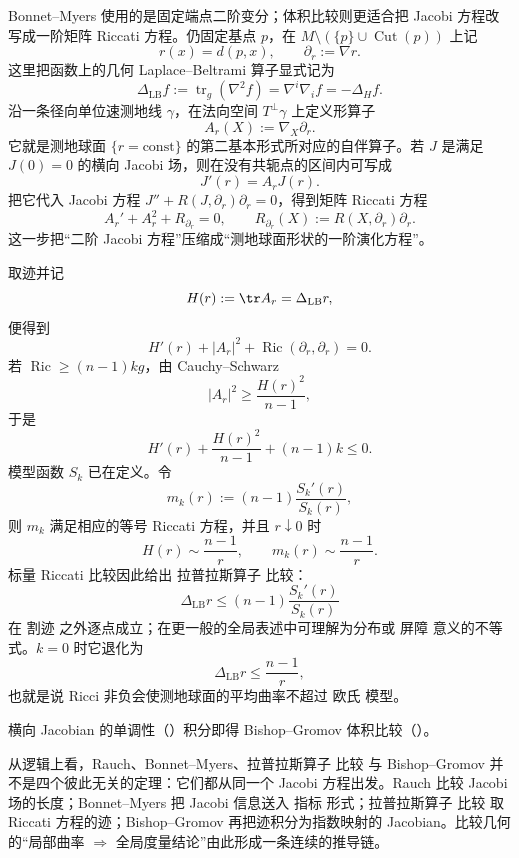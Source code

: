 Bonnet--Myers 使用的是固定端点二阶变分；体积比较则更适合把 Jacobi 方程改写成一阶矩阵 Riccati 方程。仍固定基点 $p$，在 $M\setminus(\{p\}\cup\operatorname{Cut}(p))$ 上记
\[
r(x)=d(p,x),
\qquad
\partial_r:=\nabla r.
\]
这里把函数上的几何 Laplace--Beltrami 算子显式记为
\begin{equation*}\Delta_{\mathrm{LB}}f:=\operatorname{tr}_g(\nabla^2f)=\nabla^i\nabla_i f
=-\Delta_H f.\end{equation*}
沿一条径向单位速测地线 $\gamma$，在法向空间 $T^\perp\gamma$ 上定义形算子
\begin{equation*}A_r(X):=\nabla_X\partial_r.\end{equation*}
它就是测地球面 $\{r=\text{const}\}$ 的第二基本形式所对应的自伴算子。若 $J$ 是满足 $J(0)=0$ 的横向 Jacobi 场，则在没有共轭点的区间内可写成
\[
J'(r)=A_rJ(r).
\]
把它代入 Jacobi 方程 $J''+R(J,\partial_r)\partial_r=0$，得到矩阵 Riccati 方程
\begin{equation*}{
A_r'+A_r^2+R_{\partial_r}=0,
\qquad
R_{\partial_r}(X):=R(X,\partial_r)\partial_r.}\end{equation*}
这一步把“二阶 Jacobi 方程”压缩成“测地球面形状的一阶演化方程”。

取迹并记
\[
H(r):=\tr A_r=\Delta_{\mathrm{LB}} r,
\]
便得到
\begin{equation*}H'(r)+|A_r|^2+\operatorname{Ric}(\partial_r,\partial_r)=0.\end{equation*}
若 $\operatorname{Ric}\ge(n-1)k g$，由 Cauchy--Schwarz
\[
|A_r|^2\ge\frac{H(r)^2}{n-1},
\]
于是
\begin{equation*}H'(r)+\frac{H(r)^2}{n-1}+(n-1)k\le0.\end{equation*}
模型函数 $S_k$ 已在定义。令
\[
m_k(r):=(n-1)\frac{S_k'(r)}{S_k(r)},
\]
则 $m_k$ 满足相应的等号 Riccati 方程，并且 $r\downarrow0$ 时
\[
H(r)\sim\frac{n-1}{r},
\qquad
m_k(r)\sim\frac{n-1}{r}.
\]
标量 Riccati 比较因此给出 拉普拉斯算子 比较：
\begin{equation}
{
\Delta_{\mathrm{LB}} r\le(n-1)\frac{S_k'(r)}{S_k(r)}
}
\label{eq:math-dg-laplacian-comparison}
\end{equation}
在 割迹 之外逐点成立；在更一般的全局表述中可理解为分布或 屏障 意义的不等式。$k=0$ 时它退化为
\[
\Delta_{\mathrm{LB}} r\le\frac{n-1}{r},
\]
也就是说 Ricci 非负会使测地球面的平均曲率不超过 欧氏 模型。

横向 Jacobian 的单调性（）积分即得 Bishop--Gromov 体积比较（）。

从逻辑上看，Rauch、Bonnet--Myers、拉普拉斯算子 比较 与 Bishop--Gromov 并不是四个彼此无关的定理：它们都从同一个 Jacobi 方程出发。Rauch 比较 Jacobi 场的长度；Bonnet--Myers 把 Jacobi 信息送入 指标 形式；拉普拉斯算子 比较 取 Riccati 方程的迹；Bishop--Gromov 再把迹积分为指数映射的 Jacobian。比较几何的“局部曲率 $\Rightarrow$ 全局度量结论”由此形成一条连续的推导链。

